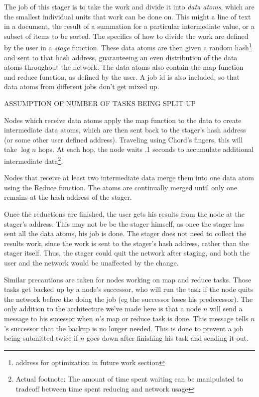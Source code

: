 \documentclass[conference, compsocconf, letterpaper]{IEEEtran}
\begin{document}
The job of this stager is to take the work and divide it into \emph{data atoms}, which are the smallest individual units that work can be done on.  This might a line of text in a document, the result of a summation for a particular intermediate value, or a subset of items to be sorted.  The specifics of how to divide the work are defined by the user in a \emph{stage} function.  These data atoms are then given a random hash\footnote{address for optimization in future work section} and sent to that hash address, guaranteeing an even distribution of the data atoms throughout the network.  The data atoms also contain the map function and reduce function, as defined by the user.  A job id is also included, so that data atoms from different jobs don't get mixed up.

ASSUMPTION OF NUMBER OF TASKS BEING SPLIT UP


Nodes which receive data atoms apply the map function to the data to create intermediate data atoms, which are then sent back to the stager's hash address (or some other user defined address).  Traveling using Chord's fingers, this will take $\log n$ hops.  At each hop, the node waits .1 seconds to accumulate additional intermediate data\footnote{Actual footnote: The amount of time spent waiting can be manipulated to tradeoff between time spent reducing and network usage}.  

Nodes that receive at least two intermediate data merge them into one data atom using the Reduce function.   The atoms are continually merged until only one remains at the hash address of the stager. 

Once the reductions are finished, the user gets his results from the node at the stager's address.  This may not be be the stager himself, as once the stager has sent all the data atoms, his job is done.  The stager does not need to collect the results work, since the work is sent to the stager's hash address, rather than the stager itself.  Thus, the stager could quit the network after staging, and both the user and the network would be unaffected by the change. %

Similar precautions are taken for nodes working on map and reduce tasks.  Those tasks get backed up  by a node's successor, who will run the task if the node quits the network before the doing the job (eg the successor loses his predecessor).   The only addition to the architecture we've made here is that a node $n$ will send a message to his sucessor when  $n$'s map or reduce task is done.  This message tells $n$'s successor that the backup is no longer needed.  This is done to prevent a job being submitted twice if $n$ goes down after finishing his task and sending it out.
\end{document}
